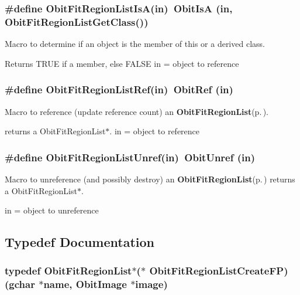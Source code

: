 \subsubsection{\setlength{\rightskip}{0pt plus 5cm}\#define Obit\-Fit\-Region\-List\-Is\-A(in)\ Obit\-Is\-A (in, Obit\-Fit\-Region\-List\-Get\-Class())}\label{ObitFitRegionList_8h_a2}


Macro to determine if an object is the member of this or a derived class. 

Returns TRUE if a member, else FALSE in = object to reference 
\subsubsection{\setlength{\rightskip}{0pt plus 5cm}\#define Obit\-Fit\-Region\-List\-Ref(in)\ Obit\-Ref (in)}\label{ObitFitRegionList_8h_a1}


Macro to reference (update reference count) an {\bf Obit\-Fit\-Region\-List}{\rm (p.\,\pageref{structObitFitRegionList})}. 

returns a Obit\-Fit\-Region\-List$\ast$. in = object to reference 
\subsubsection{\setlength{\rightskip}{0pt plus 5cm}\#define Obit\-Fit\-Region\-List\-Unref(in)\ Obit\-Unref (in)}\label{ObitFitRegionList_8h_a0}


Macro to unreference (and possibly destroy) an {\bf Obit\-Fit\-Region\-List}{\rm (p.\,\pageref{structObitFitRegionList})} returns a Obit\-Fit\-Region\-List$\ast$. 

in = object to unreference 

\subsection{Typedef Documentation}
\subsubsection{\setlength{\rightskip}{0pt plus 5cm}typedef {\bf Obit\-Fit\-Region\-List}$\ast$($\ast$ {\bf Obit\-Fit\-Region\-List\-Create\-FP})(gchar $\ast$name, {\bf Obit\-Image} $\ast$image)}\label{ObitFitRegionList_8h_a3}


